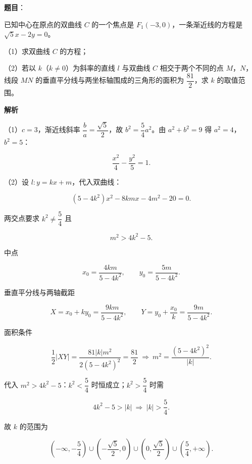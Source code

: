 \begin{answer}

\textbf{题目}：

已知中心在原点的双曲线 $C$ 的一个焦点是 $F_1(-3,0)$，一条渐近线的方程是 $\sqrt5x-2y=0$。

（1）求双曲线 $C$ 的方程；

（2）若以 $k$（$k\neq0$）为斜率的直线 $l$ 与双曲线 $C$ 相交于两个不同的点 $M$，$N$，线段 $MN$ 的垂直平分线与两坐标轴围成的三角形的面积为 $\dfrac{81}2$，求 $k$ 的取值范围。

\textbf{解析}

（1）$c=3$，渐近线斜率 $\dfrac ba=\dfrac{\sqrt5}2$，故 $b^2=\dfrac54a^2$。由 $a^2+b^2=9$ 得 $a^2=4$，$b^2=5$：

\nopagebreak[4]
\[\frac{x^2}4-\frac{y^2}5=1.\]

（2）设 $l:y=kx+m$，代入双曲线：

\nopagebreak[4]
\[(5-4k^2)x^2-8kmx-4m^2-20=0.\]

两交点要求 $k^2\neq\dfrac54$ 且

\nopagebreak[4]
\[m^2>4k^2-5.\]

中点

\nopagebreak[4]
\[x_0=\frac{4km}{5-4k^2},\qquad y_0=\frac{5m}{5-4k^2}.\]

垂直平分线与两轴截距

\nopagebreak[4]
\[X=x_0+ky_0=\frac{9km}{5-4k^2},\qquad Y=y_0+\frac{x_0}k=\frac{9m}{5-4k^2}.\]

面积条件

\nopagebreak[4]
\[\frac12|XY|=\frac{81|k|m^2}{2(5-4k^2)^2}=\frac{81}2\ \Longrightarrow\ m^2=\frac{(5-4k^2)^2}{|k|}.\]

代入 $m^2>4k^2-5$：$k^2<\dfrac54$ 时恒成立；$k^2>\dfrac54$ 时需

\nopagebreak[4]
\[4k^2-5>|k|\ \Longrightarrow\ |k|>\frac54.\]

故 $k$ 的范围为

\nopagebreak[4]
\[\left(-\infty,-\frac54\right)\cup\left(-\frac{\sqrt5}2,0\right)\cup\left(0,\frac{\sqrt5}2\right)\cup\left(\frac54,+\infty\right).\]


\end{answer}
